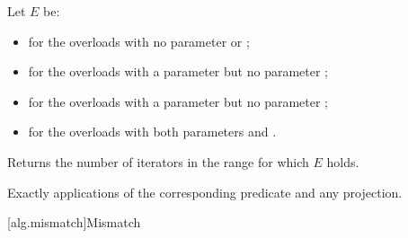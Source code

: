 \begin{itemdescr}
\pnum
Let $E$ be:
\begin{itemize}
\item
   for the overloads
  with no parameter  or ;
\item
   for the overloads
  with a parameter  but no parameter ;
\item
   for the overloads
  with a parameter  but no parameter ;
\item
   for the overloads
  with both parameters  and .
\end{itemize}

\pnum
\effects
Returns the number of iterators  in the range 
for which $E$ holds.

\pnum
\complexity
Exactly  applications
of the corresponding predicate and any projection.
\end{itemdescr}

[alg.mismatch]{Mismatch}

